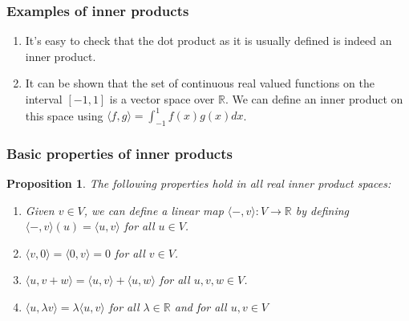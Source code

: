 \documentclass[handout]{beamer}
\newtheorem{proposition}[theorem]{Proposition}
\newcommand{\bR}{\mathbb{R}}
\begin{document}
\begin{frame}
\frametitle{Examples of inner products}
\begin{example}\mbox{}
\begin{enumerate}
\item It's easy to check that the dot product as it is usually defined is indeed an inner product.\vspace{0.5cm}
\item It can be shown that the set of continuous real valued functions on the interval $[-1,1]$ is a vector space over $\bR$. We can define an inner product on this space using $\langle f,g\rangle   = \int_{-1}^1 f(x)g(x)dx$.
\end{enumerate}
\end{example}
\end{frame}

\begin{frame}
\frametitle{Basic properties of inner products}
\begin{proposition}\label{P:LA4inner}
The following properties hold in all real inner product spaces:\vspace{0.3cm}
\begin{enumerate}
\item Given $v\in V$, we can define a linear map $\langle -, v\rangle:V\to \bR$ by defining $\langle -, v\rangle(u) = \langle u, v\rangle$ for all $u\in V$.\vspace{0.3cm}
\item $\langle v, 0 \rangle = \langle 0 , v\rangle = 0$ for all $v\in V$.\vspace{0.3cm}
\item $\langle u, v+w\rangle = \langle u, v\rangle + \langle u, w\rangle$ for all $u,v,w\in V$. \vspace{0.3cm}
\item $\langle u,\lambda v\rangle   = \lambda\langle u,v\rangle  $ for all $\lambda\in \bR$ and for all $u,v\in V$
\end{enumerate}
\end{proposition}
\end{frame}
\end{document}
